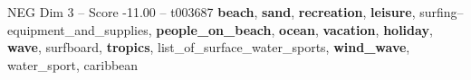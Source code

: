 \begin{textsample}{NEG Dim 3 – Score -11.00 – t003687}  \label{ex:f3_neg_034}
\textbf{beach}, \textbf{sand}, \textbf{recreation}, \textbf{leisure}, surfing--equipment\_and\_supplies, \textbf{people\_on\_beach}, \textbf{ocean}, \textbf{vacation}, \textbf{holiday}, \textbf{wave}, surfboard, \textbf{tropics}, list\_of\_surface\_water\_sports, \textbf{wind\_wave}, water\_sport, caribbean

\end{textsample}
